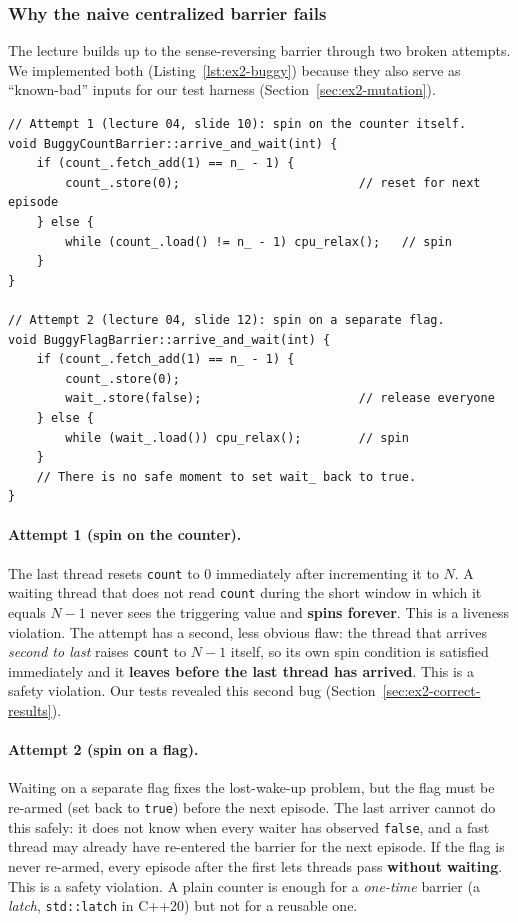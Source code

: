 \subsubsection{Why the naive centralized barrier fails}
\label{sec:ex2-naive}

The lecture builds up to the sense-reversing barrier through two broken
attempts. We implemented both (Listing~\ref{lst:ex2-buggy}) because they
also serve as ``known-bad'' inputs for our test harness
(Section~\ref{sec:ex2-mutation}).

\begin{lstlisting}[caption={The two broken centralized barriers from the lecture (simplified from \texttt{barriers.hpp}).},label={lst:ex2-buggy}]
// Attempt 1 (lecture 04, slide 10): spin on the counter itself.
void BuggyCountBarrier::arrive_and_wait(int) {
    if (count_.fetch_add(1) == n_ - 1) {
        count_.store(0);                         // reset for next episode
    } else {
        while (count_.load() != n_ - 1) cpu_relax();   // spin
    }
}

// Attempt 2 (lecture 04, slide 12): spin on a separate flag.
void BuggyFlagBarrier::arrive_and_wait(int) {
    if (count_.fetch_add(1) == n_ - 1) {
        count_.store(0);
        wait_.store(false);                      // release everyone
    } else {
        while (wait_.load()) cpu_relax();        // spin
    }
    // There is no safe moment to set wait_ back to true.
}
\end{lstlisting}

\paragraph{Attempt 1 (spin on the counter).} The last thread resets
\texttt{count} to $0$ immediately after incrementing it to $N$. A waiting
thread that does not read \texttt{count} during the short window in which
it equals $N-1$ never sees the triggering value and \textbf{spins forever}.
This is a liveness violation. The attempt has a second, less obvious
flaw: the thread that arrives \emph{second to last} raises \texttt{count}
to $N-1$ itself, so its own spin condition is satisfied immediately and it
\textbf{leaves before the last thread has arrived}. This is a safety
violation. Our tests revealed this second bug
(Section~\ref{sec:ex2-correct-results}).

\paragraph{Attempt 2 (spin on a flag).} Waiting on a separate flag fixes the
lost-wake-up problem, but the flag must be re-armed (set back to
\texttt{true}) before the next episode. The last arriver cannot do this
safely: it does not know when every waiter has observed \texttt{false}, and
a fast thread may already have re-entered the barrier for the next episode.
If the flag is never re-armed, every episode after the first lets threads
pass \textbf{without waiting}. This is a safety violation. A plain counter is
enough for a \emph{one-time} barrier (a \emph{latch}, \texttt{std::latch} in
C++20) but not for a reusable one.


